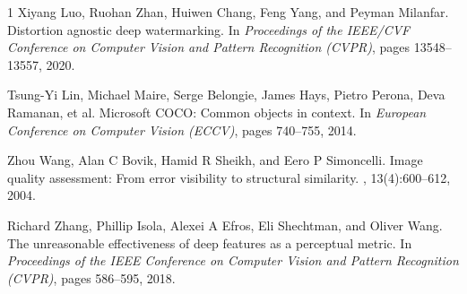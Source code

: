 \documentclass[10pt,twocolumn,letterpaper]{article}
\begin{document}
{\begin{thebibliography}{1}
    Xiyang Luo, Ruohan Zhan, Huiwen Chang, Feng Yang, and Peyman Milanfar.
    \newblock Distortion agnostic deep watermarking.
    \newblock In {\em Proceedings of the IEEE/CVF Conference on Computer Vision and Pattern Recognition (CVPR)}, pages 13548--13557, 2020.

    Tsung-Yi Lin, Michael Maire, Serge Belongie, James Hays, Pietro Perona, Deva Ramanan, et al.
    \newblock Microsoft COCO: Common objects in context.
    \newblock In {\em European Conference on Computer Vision (ECCV)}, pages 740--755, 2014.

    Zhou Wang, Alan C Bovik, Hamid R Sheikh, and Eero P Simoncelli.
    \newblock Image quality assessment: From error visibility to structural similarity.
    , 13(4):600--612, 2004.

    Richard Zhang, Phillip Isola, Alexei A Efros, Eli Shechtman, and Oliver Wang.
    \newblock The unreasonable effectiveness of deep features as a perceptual metric.
    \newblock In {\em Proceedings of the IEEE Conference on Computer Vision and Pattern Recognition (CVPR)}, pages 586--595, 2018.

    \end{thebibliography}
}
\end{document}
